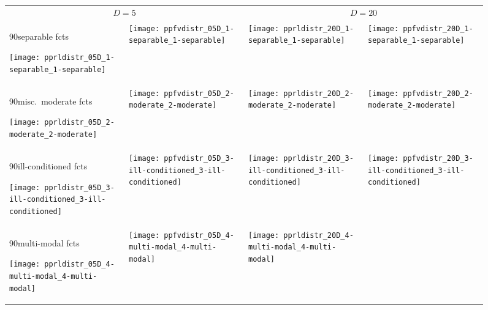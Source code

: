 \documentclass{sig-alternate}
\begin{document}
\newcommand{\rot}[2][2.5]{
  \hspace*{-3.5\baselineskip}%
  \begin{rotate}{90}\hspace{#1em}#2
  \end{rotate}}
\begin{figure*}
\begin{tabular}{l@{\hspace*{-0.025\textwidth}}l@{\hspace*{-0.00\textwidth}}|l@{\hspace*{-0.025\textwidth}}l}
\multicolumn{2}{c}{$D=5$} & \multicolumn{2}{c}{$D=20$}\\[-0.5ex]
\rot{separable fcts}
\texttt{[image: pprldistr\_05D\_1-separable\_1-separable]} &
\texttt{[image: ppfvdistr\_05D\_1-separable\_1-separable]} &
\texttt{[image: pprldistr\_20D\_1-separable\_1-separable]} &
\texttt{[image: ppfvdistr\_20D\_1-separable\_1-separable]} \\[-2ex]
\rot[1]{misc.\ moderate fcts}
\texttt{[image: pprldistr\_05D\_2-moderate\_2-moderate]} &
\texttt{[image: ppfvdistr\_05D\_2-moderate\_2-moderate]} &
\texttt{[image: pprldistr\_20D\_2-moderate\_2-moderate]} &
\texttt{[image: ppfvdistr\_20D\_2-moderate\_2-moderate]} \\[-2ex]
\rot[1.3]{ill-conditioned fcts}
\texttt{[image: pprldistr\_05D\_3-ill-conditioned\_3-ill-conditioned]} &
\texttt{[image: ppfvdistr\_05D\_3-ill-conditioned\_3-ill-conditioned]} &
\texttt{[image: pprldistr\_20D\_3-ill-conditioned\_3-ill-conditioned]} &
\texttt{[image: ppfvdistr\_20D\_3-ill-conditioned\_3-ill-conditioned]} \\[-2ex]
\rot[1.6]{multi-modal fcts}
\texttt{[image: pprldistr\_05D\_4-multi-modal\_4-multi-modal]} &
\texttt{[image: ppfvdistr\_05D\_4-multi-modal\_4-multi-modal]} &
\texttt{[image: pprldistr\_20D\_4-multi-modal\_4-multi-modal]} &

\end{tabular}
\end{figure*}
\end{document}
